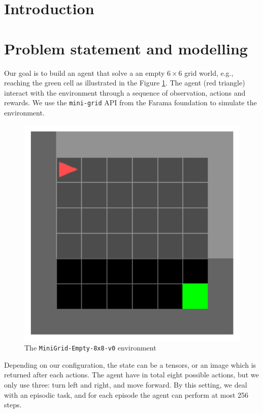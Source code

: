 \newcommand{\bydef}{\overset{\scriptscriptstyle\Delta}{=}}
\newcommand{\EE}{\mathbb{E}}
\newcommand{\PP}{\mathbb{P}}
\begin{abstract}

\end{abstract}

\section{Introduction}

\section{Problem statement and modelling}
Our goal is to build an agent that solve a an empty  $6\times6$ grid world, e.g., reaching the green cell as illustrated in the Figure \ref{fig:mini-grid}. The agent (red triangle) interact with the environment through a sequence of observation, actions and rewards. We use the \texttt{mini-grid} API from the Farama foundation to simulate the environment.
\begin{figure}[H]
	\centering
	\includegraphics[width=0.9\linewidth]{figures/grid_world.pdf}
	\caption{The \texttt{MiniGrid-Empty-8x8-v0} environment}
	\label{fig:mini-grid}
\end{figure}

Depending on our configuration, the state can be a tensors, or an image which is returned after each actions. The agent have in total eight possible actions, but we only use three: turn left and right, and move forward. By this setting, we deal with an episodic task, and for each episode the agent can perform at most 256 steps.

